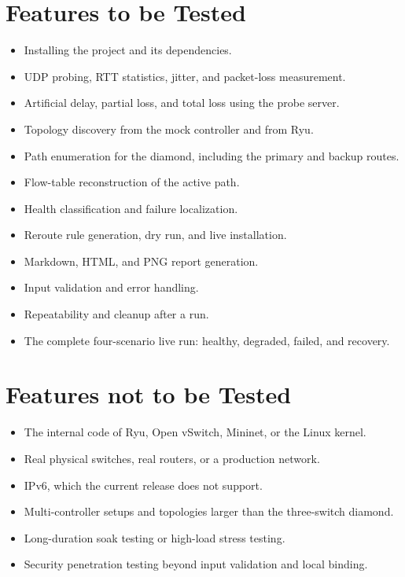 \documentclass[11pt,a4paper]{article}
\begin{document}
\section{Features to be Tested}
\begin{itemize}
  \item Installing the project and its dependencies.
  \item UDP probing, RTT statistics, jitter, and packet-loss measurement.
  \item Artificial delay, partial loss, and total loss using the probe server.
  \item Topology discovery from the mock controller and from Ryu.
  \item Path enumeration for the diamond, including the primary and backup routes.
  \item Flow-table reconstruction of the active path.
  \item Health classification and failure localization.
  \item Reroute rule generation, dry run, and live installation.
  \item Markdown, HTML, and PNG report generation.
  \item Input validation and error handling.
  \item Repeatability and cleanup after a run.
  \item The complete four-scenario live run: healthy, degraded, failed, and recovery.
\end{itemize}

\section{Features not to be Tested}
\begin{itemize}
  \item The internal code of Ryu, Open vSwitch, Mininet, or the Linux kernel.
  \item Real physical switches, real routers, or a production network.
  \item IPv6, which the current release does not support.
  \item Multi-controller setups and topologies larger than the three-switch diamond.
  \item Long-duration soak testing or high-load stress testing.
  \item Security penetration testing beyond input validation and local binding.
\end{itemize}
\end{document}
